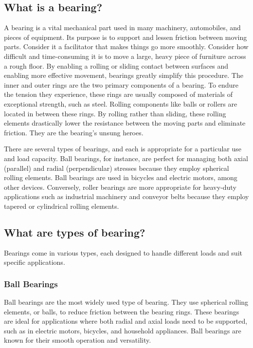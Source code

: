\documentclass[../../main]{subfiles}
\begin{document}
\subsection{What is a bearing?}
A bearing is a vital mechanical part used in many machinery, automobiles, and pieces of equipment. Its purpose is to support and lessen friction between moving parts. Consider it a facilitator that makes things go more smoothly. Consider how difficult and time-consuming it is to move a large, heavy piece of furniture across a rough floor. By enabling a rolling or sliding contact between surfaces and enabling more effective movement, bearings greatly simplify this procedure.
The inner and outer rings are the two primary components of a bearing. To endure the tension they experience, these rings are usually composed of materials of exceptional strength, such as steel. Rolling components like balls or rollers are located in between these rings. By rolling rather than sliding, these rolling elements drastically lower the resistance between the moving parts and eliminate friction. They are the bearing's unsung heroes.

There are several types of bearings, and each is appropriate for a particular use and load capacity. Ball bearings, for instance, are perfect for managing both axial (parallel) and radial (perpendicular) stresses because they employ spherical rolling elements. Ball bearings are used in bicycles and electric motors, among other devices. Conversely, roller bearings are more appropriate for heavy-duty applications such as industrial machinery and conveyor belts because they employ tapered or cylindrical rolling elements.

\subsection{What are types of bearing?}
Bearings come in various types, each designed to handle different loads and suit specific applications.

\subsubsection{Ball Bearings}
Ball bearings are the most widely used type of bearing. They use spherical rolling elements, or balls, to reduce friction between the bearing rings. These bearings are ideal for applications where both radial and axial loads need to be supported, such as in electric motors, bicycles, and household appliances. Ball bearings are known for their smooth operation and versatility.
\end{document}
